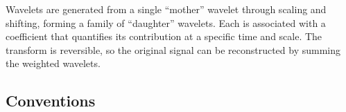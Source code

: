 \documentclass[%
 reprint,
superscriptaddress,
nofootinbib,
 amsmath,amssymb,
 aps,
colorlinks = true, 
linkcolor = blue, 
urlcolor = blue, 
citecolor = blue, 
anchorcolor = blue,
]{revtex4-2}
\begin{document}
Wavelets are generated from a single ``mother'' wavelet through scaling and shifting, forming a family of ``daughter'' wavelets. Each is associated with a coefficient that quantifies its contribution at a specific time and scale. The transform is reversible, so the original signal can be reconstructed by summing the weighted wavelets.




\subsection{Conventions}
\end{document}
